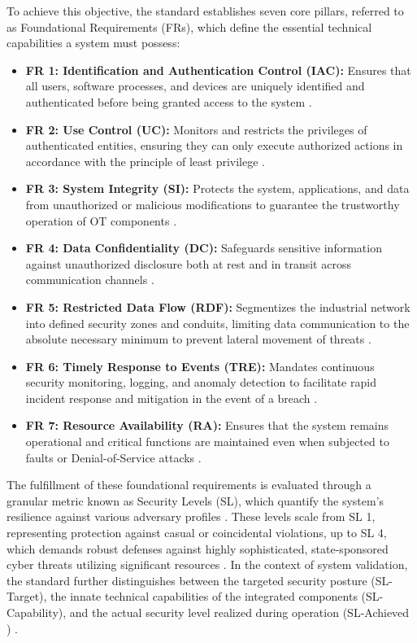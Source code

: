 To achieve this objective, the standard establishes seven core pillars, referred to 
as Foundational Requirements (FRs), which define the essential technical capabilities 
a system must possess:
\begin{itemize}
	\item \textbf{FR 1: Identification and Authentication Control (IAC):} Ensures that all 
	users, software processes, and devices are uniquely identified and authenticated 
	before being granted access to the system \cite[p. 29]{IEC62443-3-3}. 
	\item \textbf{FR 2: Use Control (UC):} Monitors and restricts the privileges of 
	authenticated entities, ensuring they can only execute authorized actions 
	in accordance with the principle of least privilege \cite[p. 41]{IEC62443-3-3}.
	\item \textbf{FR 3: System Integrity (SI):} Protects the system, applications, and data 
	from unauthorized or malicious modifications to guarantee the trustworthy 
	operation of OT components \cite[p. 50]{IEC62443-3-3}.
	\item \textbf{FR 4: Data Confidentiality (DC):} Safeguards sensitive information against 
	unauthorized disclosure both at rest and in transit across communication channels \cite[p. 57]{IEC62443-3-3}.
	\item \textbf{FR 5: Restricted Data Flow (RDF):} Segmentizes the industrial network into 
	defined security zones and conduits, limiting data communication to the absolute 
	necessary minimum to prevent lateral movement of threats \cite[p. 61]{IEC62443-3-3}.
	\item \textbf{FR 6: Timely Response to Events (TRE):} Mandates continuous security monitoring, 
	logging, and anomaly detection to facilitate rapid incident response and mitigation 
	in the event of a breach \cite[p. 65]{IEC62443-3-3}.
	\item \textbf{FR 7: Resource Availability (RA):} Ensures that the system remains operational and critical functions are maintained even when subjected to faults or 
	Denial-of-Service attacks \cite[p. 67]{IEC62443-3-3}.
\end{itemize}

The fulfillment of these foundational requirements is evaluated through a granular 
metric known as Security Levels (SL), which quantify the system's resilience 
against various adversary profiles \cite[p. 16]{IEC62443-3-3}. These levels scale from SL 1, representing  protection against casual or coincidental violations, up to SL 4, which demands robust defenses against highly sophisticated, state-sponsored cyber threats 
utilizing significant resources \cite[p. 26 f]{IEC62443-3-3}. In the context of system validation, the standard  further distinguishes between the targeted security posture (SL-Target), the innate technical capabilities of the integrated components (SL-Capability), and the actual security level realized during operation (SL-Achieved ) \cite[p. 26]{IEC62443-3-3}.


